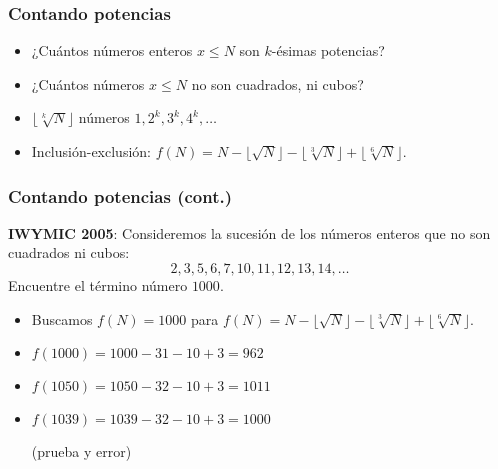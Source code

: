 \documentclass[handout]{beamer}
\begin{document}

\begin{frame}[fragile]
  \frametitle{Contando potencias}

  \begin{shaded}
    \begin{itemize}
    \item ¿Cuántos números enteros $x \le N$ son $k$-ésimas potencias?

    \item ¿Cuántos números $x \le N$ no son cuadrados, ni cubos?
    \end{itemize}
  \end{shaded}

  \vspace{\fill}

  \ifdefined\solutions

  \begin{itemize}
  \item<3-> $\lfloor \sqrt[k]{N}\rfloor$ números $1, 2^k, 3^k, 4^k, \ldots$

  \item<4-> Inclusión-exclusión:
    $f(N) = N - \lfloor\sqrt{N}\rfloor - \lfloor\sqrt[3]{N}\rfloor + \lfloor\sqrt[6]{N}\rfloor$.
  \end{itemize}
  \fi
\end{frame}


\begin{frame}[fragile]
  \frametitle{Contando potencias (cont.)}

  \begin{shaded}
    \textbf{IWYMIC 2005}: Consideremos la sucesión de los números enteros que no
    son cuadrados ni cubos:
    $$2, 3, 5, 6, 7, 10, 11, 12, 13, 14, \ldots$$
    Encuentre el término número $1000$.
  \end{shaded}

  \ifdefined\solutions

  \begin{itemize}
  \item<3-> Buscamos $f (N) = 1000$ para
    $f(N) = N - \lfloor\sqrt{N}\rfloor - \lfloor\sqrt[3]{N}\rfloor + \lfloor\sqrt[6]{N}\rfloor$.

  \item<4-> $f (1000) = 1000 - 31 - 10 + 3 = 962$

  \item<5-> $f (1050) = 1050 - 32 - 10 + 3 = 1011$

  \item<6-> $f (1039) = 1039 - 32 - 10 + 3 = 1000$

    (prueba y error)
  \end{itemize}
  \fi
\end{frame}
\end{document}
